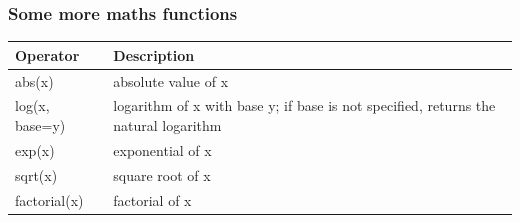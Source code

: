 \documentclass[]{article}
\begin{document}
\hypertarget{some-more-maths-functions}{%
\subsubsection{Some more maths
functions}\label{some-more-maths-functions}}

\begin{longtable}[]{@{}ll@{}}
\toprule
\begin{minipage}[b]{0.47\columnwidth}\raggedright
Operator\strut
\end{minipage} & \begin{minipage}[b]{0.47\columnwidth}\raggedright
Description\strut
\end{minipage}\tabularnewline
\midrule
\endhead
\begin{minipage}[t]{0.47\columnwidth}\raggedright
abs(x)\strut
\end{minipage} & \begin{minipage}[t]{0.47\columnwidth}\raggedright
absolute value of x\strut
\end{minipage}\tabularnewline
\begin{minipage}[t]{0.47\columnwidth}\raggedright
log(x, base=y)\strut
\end{minipage} & \begin{minipage}[t]{0.47\columnwidth}\raggedright
logarithm of x with base y; if base is not specified, returns the
natural logarithm\strut
\end{minipage}\tabularnewline
\begin{minipage}[t]{0.47\columnwidth}\raggedright
exp(x)\strut
\end{minipage} & \begin{minipage}[t]{0.47\columnwidth}\raggedright
exponential of x\strut
\end{minipage}\tabularnewline
\begin{minipage}[t]{0.47\columnwidth}\raggedright
sqrt(x)\strut
\end{minipage} & \begin{minipage}[t]{0.47\columnwidth}\raggedright
square root of x\strut
\end{minipage}\tabularnewline
\begin{minipage}[t]{0.47\columnwidth}\raggedright
factorial(x)\strut
\end{minipage} & \begin{minipage}[t]{0.47\columnwidth}\raggedright
factorial of x\strut
\end{minipage}\tabularnewline
\bottomrule
\end{longtable}
\end{document}

